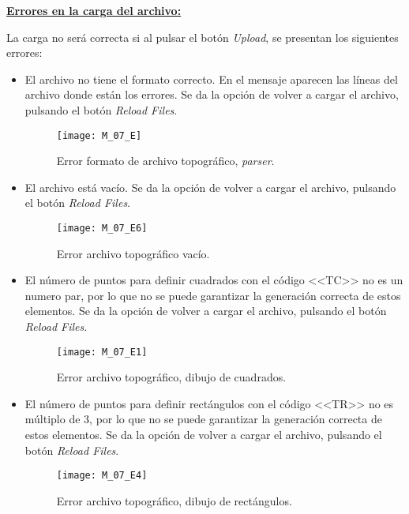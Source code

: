\textbf{\underline{Errores en la carga del archivo:} }

La carga no será correcta si al pulsar el botón \emph{Upload}, se presentan los siguientes errores:
\begin{itemize}



\item El archivo no tiene el formato correcto. En el mensaje aparecen las líneas del archivo donde están los errores. Se da la opción de volver a cargar el archivo, pulsando el botón \emph{Reload Files}.

\begin{figure}[H]
	\centering
	\texttt{[image: M\_07\_E]}
	\caption{Error formato de archivo topográfico, \emph{parser}.}
	\label{fig:M_07_E}
\end{figure}

\item El archivo está vacío. Se da la opción de volver a cargar el archivo, pulsando el botón \emph{Reload Files}.

\begin{figure}[H]
	\centering
	\texttt{[image: M\_07\_E6]}
	\caption{Error archivo topográfico vacío.}
	\label{fig:M_07_E6}
\end{figure}

\item El número de puntos para definir cuadrados con el código <<TC>> no es un numero par, por lo que no se puede garantizar la generación correcta de estos elementos. Se da la opción de volver a cargar el archivo, pulsando el botón \emph{Reload Files}.

\begin{figure}[H]
	\centering
	\texttt{[image: M\_07\_E1]}
	\caption{Error archivo topográfico, dibujo de cuadrados.}
	\label{fig:M_07_E1}
\end{figure}

\item El número de puntos para definir rectángulos con el código <<TR>> no es múltiplo de 3, por lo que no se puede garantizar la generación correcta de estos elementos. Se da la opción de volver a cargar el archivo, pulsando el botón \emph{Reload Files}.

\begin{figure}[H]
	\centering
	\texttt{[image: M\_07\_E4]}
	\caption{Error archivo topográfico, dibujo de rectángulos.}
	\label{fig:M_07_E4}
\end{figure}

\end{itemize}


